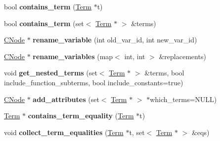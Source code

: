 \begin{DoxyCompactItemize}
\item 
\hypertarget{classCNode_a10164153f252916e456e055c316d47a5}{bool {\bfseries contains\-\_\-term} (\hyperlink{classTerm}{\-Term} $\ast$t)}\label{classCNode_a10164153f252916e456e055c316d47a5}

\item 
\hypertarget{classCNode_a156bf58e215ebbdaac842f00b5e63918}{bool {\bfseries contains\-\_\-term} (set$<$ \hyperlink{classTerm}{\-Term} $\ast$ $>$ \&terms)}\label{classCNode_a156bf58e215ebbdaac842f00b5e63918}

\item 
\hypertarget{classCNode_a58ba20cf8663d331e3d673663aaaea3a}{\hyperlink{classCNode}{\-C\-Node} $\ast$ {\bfseries rename\-\_\-variable} (int old\-\_\-var\-\_\-id, int new\-\_\-var\-\_\-id)}\label{classCNode_a58ba20cf8663d331e3d673663aaaea3a}

\item 
\hypertarget{classCNode_aa25a2fba15e7aeb52174407a93aa4896}{\hyperlink{classCNode}{\-C\-Node} $\ast$ {\bfseries rename\-\_\-variables} (map$<$ int, int $>$ \&replacements)}\label{classCNode_aa25a2fba15e7aeb52174407a93aa4896}

\item 
\hypertarget{classCNode_a4e8f06ac7ad1d2bda0bb78fccc74d2aa}{void {\bfseries get\-\_\-nested\-\_\-terms} (set$<$ \hyperlink{classTerm}{\-Term} $\ast$ $>$ \&terms, bool include\-\_\-function\-\_\-subterms, bool include\-\_\-constants=true)}\label{classCNode_a4e8f06ac7ad1d2bda0bb78fccc74d2aa}

\item 
\hypertarget{classCNode_af8d20473d1835212ab5d5cfd1f4773af}{\hyperlink{classCNode}{\-C\-Node} $\ast$ {\bfseries add\-\_\-attributes} (set$<$ \hyperlink{classTerm}{\-Term} $\ast$ $>$ $\ast$which\-\_\-terms=\-N\-U\-L\-L)}\label{classCNode_af8d20473d1835212ab5d5cfd1f4773af}

\item 
\hypertarget{classCNode_a2b96f8c546f271a2d8843369fca71cfc}{\hyperlink{classTerm}{\-Term} $\ast$ {\bfseries contains\-\_\-term\-\_\-equality} (\hyperlink{classTerm}{\-Term} $\ast$t)}\label{classCNode_a2b96f8c546f271a2d8843369fca71cfc}

\item 
\hypertarget{classCNode_a1cc071b0fb85fc2c20fb3d502fdb5525}{void {\bfseries collect\-\_\-term\-\_\-equalities} (\hyperlink{classTerm}{\-Term} $\ast$t, set$<$ \hyperlink{classTerm}{\-Term} $\ast$ $>$ \&eqs)}\label{classCNode_a1cc071b0fb85fc2c20fb3d502fdb5525}


\end{DoxyCompactItemize}
